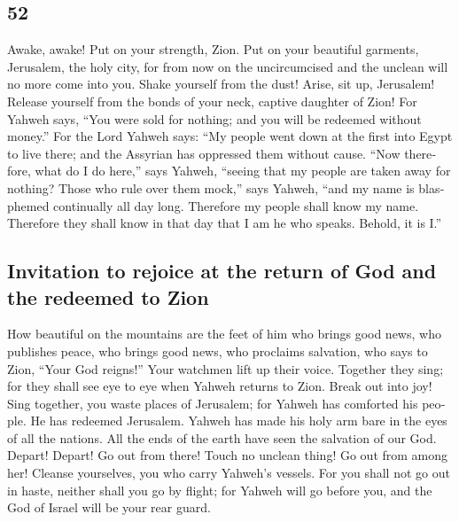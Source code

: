 \begin{paracol}{2}
\begin{otherlanguage}{english}
\hypertarget{section-103}{%
\section{52}\label{section-103}}

 Awake, awake! Put on your strength, Zion. Put on your
beautiful garments, Jerusalem, the holy city, for from now on the
uncircumcised and the unclean will no more come into you. 
Shake yourself from the dust! Arise, sit up, Jerusalem! Release yourself
from the bonds of your neck, captive daughter of Zion! 
For Yahweh says, ``You were sold for nothing; and you will be redeemed
without money.''  For the Lord Yahweh says: ``My people
went down at the first into Egypt to live there; and the Assyrian has
oppressed them without cause.  ``Now therefore, what do I
do here,'' says Yahweh, ``seeing that my people are taken away for
nothing? Those who rule over them mock,'' says Yahweh, ``and my name is
blasphemed continually all day long.  Therefore my people
shall know my name. Therefore they shall know in that day that I am he
who speaks. Behold, it is I.''

\hypertarget{invitation-to-rejoice-at-the-return-of-god-and-the-redeemed-to-zion}{%
\subsection{Invitation to rejoice at the return of God and the redeemed
to
Zion}\label{invitation-to-rejoice-at-the-return-of-god-and-the-redeemed-to-zion}}

 How beautiful on the mountains are the feet of him who
brings good news, who publishes peace, who brings good news, who
proclaims salvation, who says to Zion, ``Your God reigns!''
 Your watchmen lift up their voice. Together they sing;
for they shall see eye to eye when Yahweh returns to Zion.
 Break out into joy! Sing together, you waste places of
Jerusalem; for Yahweh has comforted his people. He has redeemed
Jerusalem.  Yahweh has made his holy arm bare in the eyes
of all the nations. All the ends of the earth have seen the salvation of
our God.  Depart! Depart! Go out from there! Touch no
unclean thing! Go out from among her! Cleanse yourselves, you who carry
Yahweh's vessels.  For you shall not go out in haste,
neither shall you go by flight; for Yahweh will go before you, and the
God of Israel will be your rear guard.


\end{otherlanguage}
\end{paracol}
